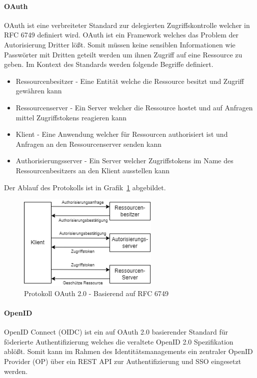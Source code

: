 \documentclass[12pt]{article}
\begin{document}
\paragraph{OAuth}
OAuth ist eine verbreiteter Standard zur delegierten Zugriffskontrolle welcher in RFC 6749 definiert wird. OAuth ist ein Framework welches das Problem der Autorisierung Dritter lößt. Somit müssen keine sensiblen Informationen wie Passwörter mit Dritten geteilt werden um ihnen Zugriff auf eine Ressource zu geben. Im Kontext des Standards werden folgende Begriffe definiert.
\begin{itemize}
  \item Ressourcenbesitzer - Eine Entität welche die Ressource besitzt und Zugriff gewähren kann
  \item Ressourcenserver - Ein Server welcher die Ressource hostet und auf Anfragen mittel Zugriffstokens reagieren kann
  \item Klient - Eine Anwendung welcher für Ressourcen authorisiert ist und Anfragen an den Ressourcenserver senden kann
  \item Authorisierungsserver - Ein Server welcher Zugriffstokens im Name des Ressourcenbesitzers an den Klient ausstellen kann
\end{itemize}
Der Ablauf des Protokolls ist in Grafik~\cref{fig:oauth} abgebildet.~\cite{rfc6749}
\begin{figure}[H]
  \centering
  \includegraphics[width=0.6\textwidth]{assets/oauth.png}
  \caption{Protokoll OAuth 2.0 - Basierend auf RFC 6749}\label{fig:oauth}
\end{figure}
\paragraph{OpenID}
OpenID Connect (OIDC) ist ein auf OAuth 2.0 basierender Standard für föderierte Authentifizierung welches die veraltete OpenID 2.0 Spezifikation ablößt. Somit kann im Rahmen des Identitätsmanagements ein zentraler OpenID Provider (OP) über ein REST API zur Authentifizierung und SSO eingesetzt werden.~\cite{naik2017choice}
\end{document}
